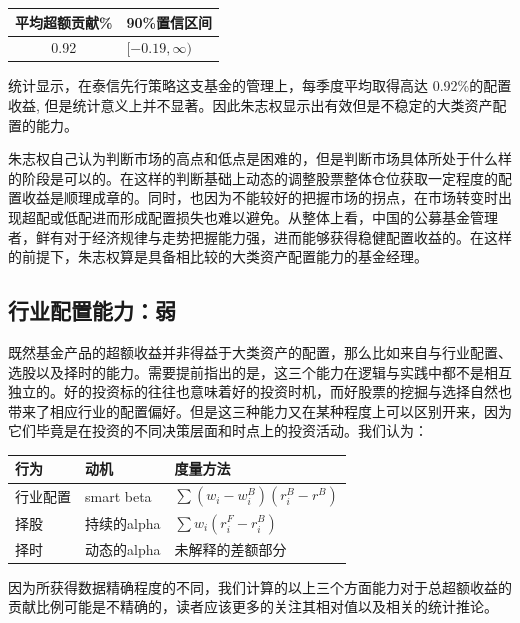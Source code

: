 \documentclass[hyperref,]{ctexart}
\begin{document}
\begin{longtable}[]{@{}cl@{}}
\toprule
平均超额贡献\% & 90\%置信区间\tabularnewline
\midrule
\endhead
0.92 & \([-0.19,\infty)\)\tabularnewline
\bottomrule
\end{longtable}

统计显示，在泰信先行策略这支基金的管理上，每季度平均取得高达
0.92\%的配置收益,
但是统计意义上并不显著。因此朱志权显示出有效但是不稳定的大类资产配置的能力。

朱志权自己认为判断市场的高点和低点是困难的，但是判断市场具体所处于什么样的阶段是可以的。在这样的判断基础上动态的调整股票整体仓位获取一定程度的配置收益是顺理成章的。同时，也因为不能较好的把握市场的拐点，在市场转变时出现超配或低配进而形成配置损失也难以避免。从整体上看，中国的公募基金管理者，鲜有对于经济规律与走势把握能力强，进而能够获得稳健配置收益的。在这样的前提下，朱志权算是具备相比较的大类资产配置能力的基金经理。

\subsection{行业配置能力：弱}

既然基金产品的超额收益并非得益于大类资产的配置，那么比如来自与行业配置、选股以及择时的能力。需要提前指出的是，这三个能力在逻辑与实践中都不是相互独立的。好的投资标的往往也意味着好的投资时机，而好股票的挖掘与选择自然也带来了相应行业的配置偏好。但是这三种能力又在某种程度上可以区别开来，因为它们毕竟是在投资的不同决策层面和时点上的投资活动。我们认为：

\begin{longtable}[]{@{}lll@{}}
\toprule
行为 & 动机 & 度量方法\tabularnewline
\midrule
\endhead
行业配置 & smart beta & \(\sum(w_i-w_i^B)(r_i^B-r^B)\)\tabularnewline
择股 & 持续的alpha & \(\sum w_{i}(r_{i}^F-r_{i}^B)\)\tabularnewline
择时 & 动态的alpha & 未解释的差额部分\tabularnewline
\bottomrule
\end{longtable}

因为所获得数据精确程度的不同，我们计算的以上三个方面能力对于总超额收益的贡献比例可能是不精确的，读者应该更多的关注其相对值以及相关的统计推论。
\end{document}
